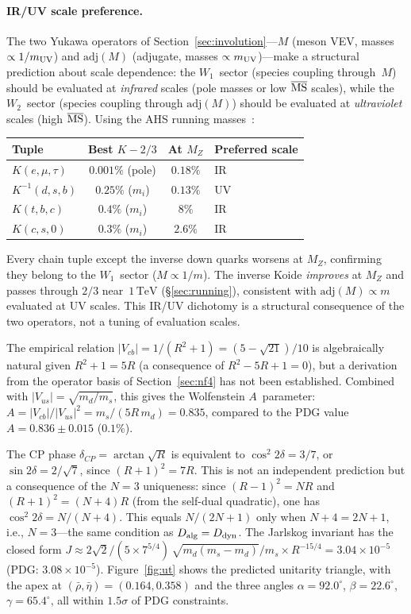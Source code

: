 \documentclass[12pt,a4paper]{article}
\makeatletter
\newcommand{\adj}{\mathrm{adj}}
\newcommand{\TeV}{\,\mathrm{TeV}}
\newcommand{\ie}{i.e.\@}
\makeatother
\begin{document}
\paragraph{IR/UV scale preference.}
The two Yukawa operators of Section~\ref{sec:involution}---$M$
(meson VEV, masses $\propto 1/m_{\rm UV}$) and $\adj(M)$
(adjugate, masses $\propto m_{\rm UV}$)---make a structural
prediction about scale dependence: the $W_1$~sector (species
coupling through~$M$) should be evaluated at \emph{infrared}
scales (pole masses or low $\overline{\rm MS}$ scales), while
the $W_2$~sector (species coupling through $\adj(M)$) should be
evaluated at \emph{ultraviolet} scales (high $\overline{\rm MS}$).
Using the AHS running masses~\cite{AntuschHinzeSaad:2025}:
\begin{center}
\begin{tabular}{lccl}
\toprule
Tuple & Best $K - 2/3$ & At $M_Z$ & Preferred scale \\
\midrule
$K(e,\mu,\tau)$ & $0.001\%$ (pole) & $0.18\%$ & IR \\
$K^{-1}(d,s,b)$ & $0.25\%$ ($m_i$) & $0.13\%$ & UV \\
$K(t,b,c)$ & $0.4\%$ ($m_i$) & $8\%$ & IR \\
$K(c,s,0)$ & $0.3\%$ ($m_i$) & $2.6\%$ & IR \\
\bottomrule
\end{tabular}
\end{center}
Every chain tuple except the inverse down quarks worsens at $M_Z$,
confirming they belong to the $W_1$~sector ($M \propto 1/m$).
The inverse Koide \emph{improves} at $M_Z$ and passes through
$2/3$ near~$1\TeV$ (\S\ref{sec:running}), consistent with
$\adj(M) \propto m$ evaluated at UV scales. This IR/UV
dichotomy is a structural consequence of the two operators,
not a tuning of evaluation scales.

The empirical relation $|V_{cb}| = 1/(R^2 + 1) = (5-\sqrt{21})/10$
is algebraically natural given $R^2 + 1 = 5R$ (a consequence of
$R^2 - 5R + 1 = 0$), but a derivation from the operator basis of
Section~\ref{sec:nf4} has not been established.
Combined with $|V_{us}| = \sqrt{m_d/m_s}$, this gives the Wolfenstein
$A$~parameter: $A = |V_{cb}|/|V_{us}|^2 = m_s/(5R\,m_d) = 0.835$,
compared to the PDG value $A = 0.836 \pm 0.015$ ($0.1\%$).

The CP phase $\delta_{CP} = \arctan\sqrt{R}$ is equivalent to
$\cos^2 2\delta = 3/7$, or $\sin 2\delta = 2/\sqrt{7}$, since
$(R{+}1)^2 = 7R$. This is not an independent prediction but a
consequence of the $N=3$ uniqueness:
since $(R{-}1)^2 = NR$ and $(R{+}1)^2 = (N{+}4)R$ (from the self-dual
quadratic), one has $\cos^2 2\delta = N/(N{+}4)$. This equals
$N/(2N{+}1)$ only when $N{+}4 = 2N{+}1$, \ie, $N=3$---the same
condition as $D_{\rm alg} = D_{\rm dyn}$.
The Jarlskog invariant has the closed form
$J \approx 2\sqrt{2}/(5 \times 7^{5/4})\,\sqrt{m_d(m_s{-}m_d)}/m_s
\times R^{-15/4} = 3.04 \times 10^{-5}$ (PDG: $3.08 \times 10^{-5}$).
Figure~\ref{fig:ut} shows the predicted unitarity triangle, with the
apex at $(\bar\rho, \bar\eta) = (0.164, 0.358)$ and the three angles
$\alpha = 92.0^\circ$, $\beta = 22.6^\circ$, $\gamma = 65.4^\circ$,
all within $1.5\sigma$ of PDG constraints.
\end{document}
